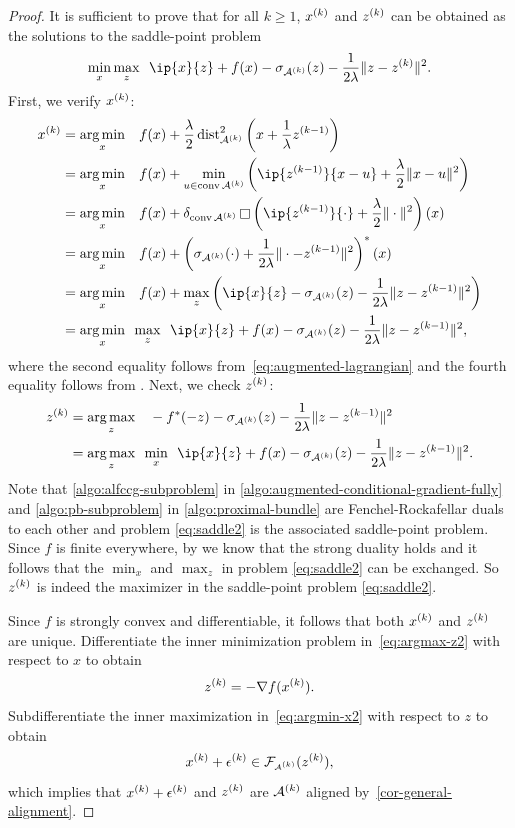\begin{proof}
  It is sufficient to prove that for all $k\geq1$, $x^{(k)}$ and $z^{(k)}$ can be
   obtained as the solutions to the saddle-point problem
   \begin{equation} \label{eq:saddle2}
     \min_{x}\max_{z}\enspace \ip{x}{z} + f(x) -  \sigma_{\Ascr\k}(z) - \frac{1}{2\lambda}\|z - z\k\|^2.
   \end{equation}
   First, we verify $x^{(k)}$:
   \begin{align}
     x\k &= \argmin{x} \enspace f(x) + \frac{\lambda}{2}\dist_{\Ascr\k}^2\left(x + \frac{1}{\lambda}z\km1\right)\nonumber
         \\&= \argmin{x} \enspace f(x) + \min_{u \in \conv\Ascr\k} \bigg(\ip{z\km1}{x - u} + \frac{\lambda}{2}\|x - u\|^2\bigg)\nonumber
         \\&= \argmin{x} \enspace f(x) + \delta_{\conv\Ascr\k}\infc\left(\ip{z\km1}{\cdot} + \frac{\lambda}{2}\|\cdot\|^2\right)(x)\nonumber
         \\&= \argmin{x} \enspace f(x) + \left(\sigma_{\Ascr\k}(\cdot) + \frac{1}{2\lambda}\|\cdot - z\km1\|^2\right)^*(x)\nonumber
         \\&= \argmin{x} \enspace f(x) + \max_z\left(\ip{x}{z} -  \sigma_{\Ascr\k}(z) - \frac{1}{2\lambda}\|z - z\km1\|^2\right)\nonumber
         \\&= \argmin{x} \max_z \enspace \ip{x}{z} + f(x) -  \sigma_{\Ascr\k}(z) - \frac{1}{2\lambda}\|z - z\km1\|^2 \label{eq:argmin-x2},
   \end{align}
   where the second equality follows from~\eqref{eq:augmented-lagrangian} and the
   fourth equality follows from \citet[Theorem~16.4]{rockafellar1970convex}. Next, we check $z^{(k)}$:
   \begin{align}
     z\k &= \argmax{z} \enspace -f^*(-z) - \sigma_{\Ascr\k}(z) - \frac{1}{2\lambda}\|z - z\km1\|^2\nonumber
         \\&= \argmax{z} \min_x\enspace \ip{x}{z} + f(x) - \sigma_{\Ascr\k}(z) - \frac{1}{2\lambda}\|z - z\km1\|^2\label{eq:argmax-z2}.
   \end{align}
   Note that \autoref{algo:alfccg-subproblem} in \autoref{algo:augmented-conditional-gradient-fully} and \autoref{algo:pb-subproblem} in \autoref{algo:proximal-bundle} are Fenchel-Rockafellar duals to each other and problem \eqref{eq:saddle2} is the associated saddle-point problem. Since $f$ is finite everywhere, by \cite[Theorem~31.1]{rockafellar1970convex} we know that the strong duality holds and it follows that the $\min_x$ and $\max_z$ in problem \eqref{eq:saddle2} can be exchanged. So $z^{(k)}$ is indeed the maximizer in the saddle-point problem \eqref{eq:saddle2}.
 
   Since $f$ is strongly convex and differentiable, it follows that both $x^{(k)}$ and $z^{(k)}$ are unique. Differentiate the inner minimization problem in~\eqref{eq:argmax-z2} with
   respect to $x$ to obtain 
   \[z^{(k)} = -\nabla f(x^{(k)}).\]
   Subdifferentiate the inner maximization in~\eqref{eq:argmin-x2} with respect to $z$ to obtain
   \[x^{(k)} + \epsilon^{(k)} \in \mathcal{F}_{\scriptscriptstyle \mathcal{A}^{(k)}}(z^{(k)}),\] which implies that $x^{(k)} + \epsilon^{(k)}$ and $z^{(k)}$ are $\mathcal{A}^{(k)}$ aligned by~\autoref{cor-general-alignment}.
 \end{proof}



